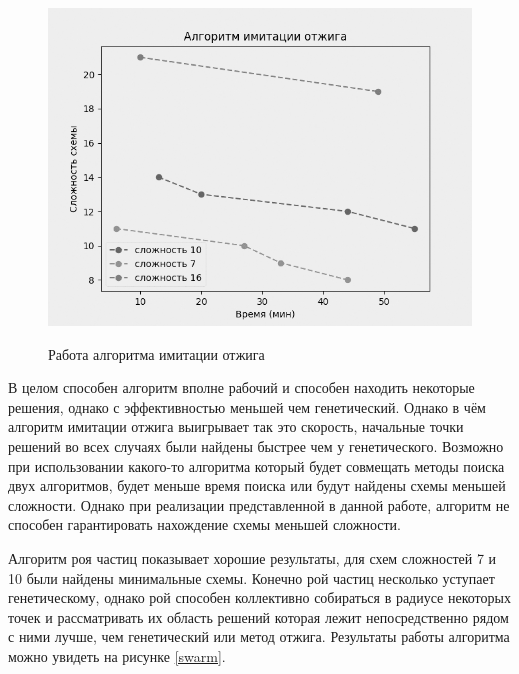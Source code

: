 \documentclass[14pt]{extarticle} %
\begin{document}
\begin{figure}[h]
	\centering
	\caption{Работа алгоритма имитации отжига}
	\includegraphics[scale=0.8]{img/figure_2.png}
	\label{ann}
\end{figure}



В целом способен алгоритм вполне рабочий и способен находить некоторые решения, однако с эффективностью меньшей чем генетический. Однако в чём алгоритм имитации отжига выигрывает так это скорость, начальные точки решений во всех случаях были найдены быстрее чем у генетического. Возможно при использовании какого-то алгоритма который будет совмещать методы  поиска двух алгоритмов, будет меньше время поиска или будут найдены схемы меньшей сложности. Однако при реализации представленной в данной работе, алгоритм не способен гарантировать нахождение схемы меньшей сложности.


Алгоритм роя частиц показывает хорошие результаты, для схем сложностей 7 и 10 были найдены минимальные схемы. Конечно рой частиц несколько уступает генетическому, однако рой способен коллективно собираться в радиусе некоторых точек и рассматривать их область решений которая лежит непосредственно рядом с ними лучше, чем генетический или метод отжига. Результаты работы алгоритма можно увидеть на рисунке \ref{swarm}. 
\end{document}
